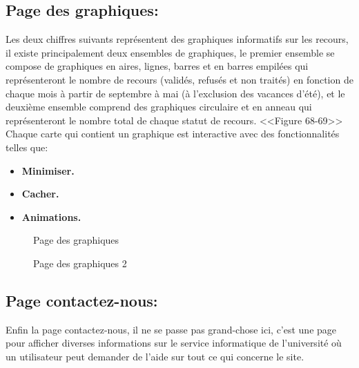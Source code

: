 \documentclass[12pt]{report}
\begin{document}
\subsection{Page des graphiques:}

Les deux chiffres suivants représentent des graphiques informatifs sur les recours, il existe principalement deux ensembles de graphiques, le premier ensemble se compose de graphiques en aires, lignes, barres et en barres empilées qui représenteront le nombre de recours (validés, refusés et non traités) en fonction de chaque mois à partir de septembre à mai (à l'exclusion des vacances d'été), et le deuxième ensemble comprend des graphiques circulaire et en anneau qui représenteront le nombre total de chaque statut de recours. <<Figure 68-69>>
\\
Chaque carte qui contient un graphique est interactive avec des fonctionnalités telles que:
\begin{itemize}
  \item \textbf{Minimiser.}
  \item \textbf{Cacher.}
  \item \textbf{Animations.}
\end{itemize}

\newpage

\begin{figure}[H]
\centering
  \vspace*{-0.3in}
  \hspace*{-0.1in}
\caption{Page des graphiques}
\end{figure}

\begin{figure}[H]
\centering
  \vspace*{0.05in}
  \hspace*{-0.1in}
\caption{Page des graphiques 2}
  \vspace*{-0.1in}
\end{figure}

\newpage

\subsection{Page contactez-nous:}

Enfin la page contactez-nous, il ne se passe pas grand-chose ici, c'est une page pour afficher diverses informations sur le service informatique de l'université où un utilisateur peut demander de l'aide sur tout ce qui concerne le site.
\end{document}
